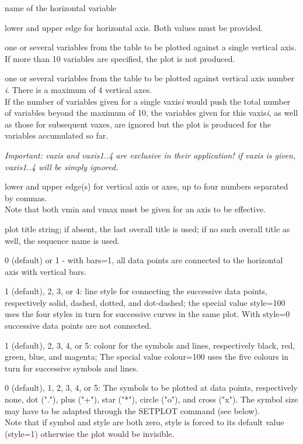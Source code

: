 \begin{madlist}
    name of the horizontal variable 

    lower and upper edge for horizontal axis. Both
   values must be provided. 

    one or several variables from the table to be plotted
     against a single vertical axis. If more than 10 variables are
     specified, the plot is not produced.   

    one or several variables from the table to be plotted
     against vertical axis number {\sl i}. There is a maximum of 4
     vertical axes. \\
     If the number of variables given for a single vaxis{\sl i} would
     push the total number of variables beyond the maximum of 10, the
     variables given for this vaxis{\sl i}, as well as those for
     subsequent vaxes, are ignored but the plot is produced for the
     variables accumulated so far.  

   \textit{Important: vaxis and vaxis{1..4} are exclusive in their
     application! if vaxis is given, vaxis{1..4} will be simply ignored.} 

    lower and upper edge(s) for vertical axis or axes, up to four
     numbers separated by commas.\\
     Note that both vmin and vmax must be given for an axis to be effective.   

    plot title string; if absent, the last overall title is
     used; if no such overall title as well, the sequence name is used.

    0 (default) or 1 - with bars=1, all data points
     are connected to the horizontal axis with vertical bars.   

    1 (default), 2, 3, or 4: line style for connecting the
     successive data points, respectively solid, dashed, dotted, and dot-dashed; 
     the special value style=100 uses the four styles in turn for
     successive curves in the same plot. 
     With style=0 successive data points are not connected. 

    1 (default), 2, 3, 4, or 5: colour for the symbols and lines, 
     respectively black, red, green, blue, and magenta; 
     The special value colour=100  uses the five colours in turn for
     successive symbols and lines.

    0 (default), 1, 2, 3, 4, or 5: The symbols to be
     plotted at data points, respectively none, dot ("."), plus ("+"),
     star ("*"), circle ("o"), and cross ("x").  
     The symbol size may have to be adapted through the SETPLOT command
     (see below). \\ 
     Note that if symbol and style are both zero, style is
     forced to its default value (style=1) otherwise the plot would be
     invisible. 


\end{madlist}
